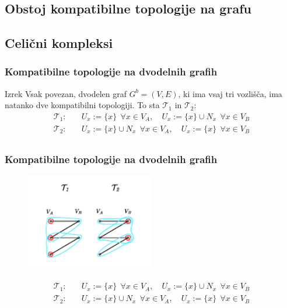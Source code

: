 \documentclass{beamer}
\begin{document}
\subsection{Obstoj kompatibilne topologije na grafu}
\subsection{Celični kompleksi}

\begin{frame}[t]
    \frametitle{Kompatibilne topologije na dvodelnih grafih}
    \begin{block}{Izrek}
        Vsak povezan, dvodelen graf $G^b = (V,E)$, ki ima vsaj tri vozlišča, ima natanko
    dve kompatibilni topologiji. To sta $\mathcal{T}_1$ in $\mathcal{T}_2$:
        \[
          \begin{split}
          \mathcal{T}_1:&\quad
          U_x:=\{x\}\ \ \forall x \in V_A, \quad
          U_x:=\{x\}\cup N_x\ \  \forall x \in V_B\\
          \mathcal{T}_2:&\quad
          U_x:=\{x\}\cup N_x\ \  \forall x \in V_A, \quad
          U_x:=\{x\}\ \ \forall x \in V_B\\
        \end{split}
        \]
    \end{block}
\end{frame}
\begin{frame}[t]
    \frametitle{Kompatibilne topologije na dvodelnih grafih}
    \begin{figure}
        \begin{center}
        \includegraphics[width=0.5\textwidth]{t1t2_skica.pdf}
        \end{center}
    \end{figure}
    \[
        \begin{split}
        \mathcal{T}_1:&\quad
        U_x:=\{x\}\ \ \forall x \in V_A, \quad
        U_x:=\{x\}\cup N_x\ \  \forall x \in V_B\\
        \mathcal{T}_2:&\quad
        U_x:=\{x\}\cup N_x\ \  \forall x \in V_A, \quad
        U_x:=\{x\}\ \ \forall x \in V_B\\
    \end{split}
    \]
\end{frame}
\end{document}
